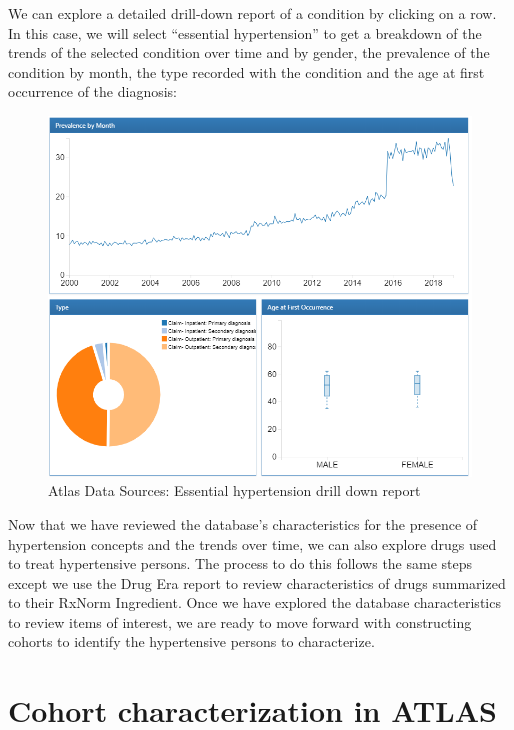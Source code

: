 \documentclass[11pt]{book}
\theoremstyle{definition}
\theoremstyle{definition}
\theoremstyle{definition}
\theoremstyle{remark}
\begin{document}
We can explore a detailed drill-down report of a condition by clicking on a row. In this case, we will select ``essential hypertension'' to get a breakdown of the trends of the selected condition over time and by gender, the prevalence of the condition by month, the type recorded with the condition and the age at first occurrence of the diagnosis:

\begin{figure}

{\centering \includegraphics[width=1\linewidth]{images/Characterization/atlasDataSourcesDrillDownReport} 

}

\caption{Atlas Data Sources: Essential hypertension drill down report}\label{fig:atlasDataSourcesDrillDownReport}
\end{figure}

Now that we have reviewed the database's characteristics for the presence of hypertension concepts and the trends over time, we can also explore drugs used to treat hypertensive persons. The process to do this follows the same steps except we use the Drug Era report to review characteristics of drugs summarized to their RxNorm Ingredient. Once we have explored the database characteristics to review items of interest, we are ready to move forward with constructing cohorts to identify the hypertensive persons to characterize.

\hypertarget{cohort-characterization-in-atlas}{%
\section{Cohort characterization in ATLAS}\label{cohort-characterization-in-atlas}}
\end{document}
